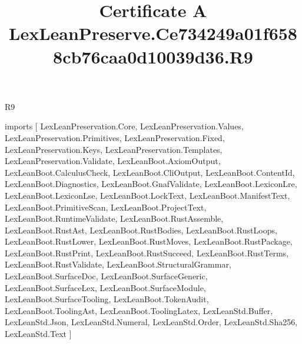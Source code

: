 \begin{lexlean}{R9}
\title{Certificate A LexLeanPreserve.Ce734249a01f6588cb76caa0d10039d36.R9}
\begin{coremodule}
imports [
  LexLeanPreservation.Core,
  LexLeanPreservation.Values,
  LexLeanPreservation.Primitives,
  LexLeanPreservation.Fixed,
  LexLeanPreservation.Keys,
  LexLeanPreservation.Templates,
  LexLeanPreservation.Validate,
  LexLeanBoot.AxiomOutput,
  LexLeanBoot.CalculusCheck,
  LexLeanBoot.CliOutput,
  LexLeanBoot.ContentId,
  LexLeanBoot.Diagnostics,
  LexLeanBoot.GnafValidate,
  LexLeanBoot.LexiconLre,
  LexLeanBoot.LexiconLse,
  LexLeanBoot.LockText,
  LexLeanBoot.ManifestText,
  LexLeanBoot.PrimitiveScan,
  LexLeanBoot.ProjectText,
  LexLeanBoot.RuntimeValidate,
  LexLeanBoot.RustAssemble,
  LexLeanBoot.RustAst,
  LexLeanBoot.RustBodies,
  LexLeanBoot.RustLoops,
  LexLeanBoot.RustLower,
  LexLeanBoot.RustMoves,
  LexLeanBoot.RustPackage,
  LexLeanBoot.RustPrint,
  LexLeanBoot.RustSucceed,
  LexLeanBoot.RustTerms,
  LexLeanBoot.RustValidate,
  LexLeanBoot.StructuralGrammar,
  LexLeanBoot.SurfaceDoc,
  LexLeanBoot.SurfaceGeneric,
  LexLeanBoot.SurfaceLex,
  LexLeanBoot.SurfaceModule,
  LexLeanBoot.SurfaceTooling,
  LexLeanBoot.TokenAudit,
  LexLeanBoot.ToolingAst,
  LexLeanBoot.ToolingLatex,
  LexLeanStd.Buffer,
  LexLeanStd.Json,
  LexLeanStd.Numeral,
  LexLeanStd.Order,
  LexLeanStd.Sha256,
  LexLeanStd.Text
]


\end{coremodule}
\end{lexlean}
